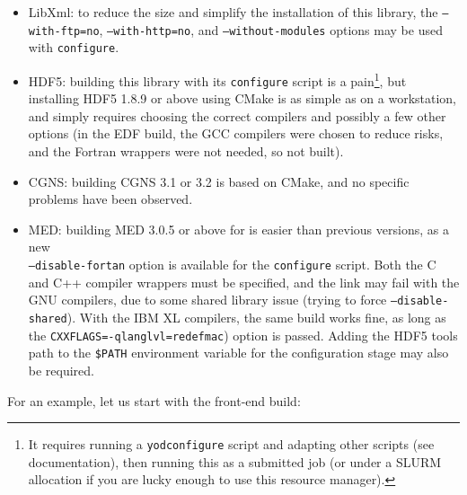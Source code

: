 \documentclass[a4paper,10pt,twoside]{csshortdoc}
\begin{document}
\begin{itemize}
\item LibXml: to reduce the size and simplify the installation of this
library, the \texttt{--with-ftp=no}, \texttt{--with-http=no},
and \texttt{--without-modules} options may be used with \texttt{configure}.
\item HDF5: building this library with its \texttt{configure} script
is a pain\footnote{It requires running a \texttt{yodconfigure}
script and adapting other scripts (see documentation), then running
this as a submitted job (or under a SLURM allocation if you are lucky
enough to use this resource manager).}, but installing HDF5 1.8.9 or above
using CMake is as simple as on a workstation, and simply requires
choosing the correct compilers and possibly a few other options (in
the EDF \CS build, the GCC compilers were chosen to reduce risks, and
the Fortran wrappers were not needed, so not built).
\item CGNS: building CGNS 3.1 or 3.2 is based on CMake, and no specific
problems have been observed.
\item MED: building MED 3.0.5 or above for \CS is easier than previous versions,
as a new \\ \texttt{--disable-fortan} option is available for the
\texttt{configure} script. Both the C and C++ compiler wrappers
must be specified, and the link may fail with the GNU compilers, due
to some shared library issue (trying to force \texttt{--disable-shared}).
With the IBM XL compilers, the same build works fine, as long as the
\texttt{CXXFLAGS=-qlanglvl=redefmac}) option is passed. Adding
the HDF5 tools path to the \texttt{\$PATH} environment variable for
the  configuration stage may also be required.
\end{itemize}

For an example, let us start with the front-end build:

\end{document}
